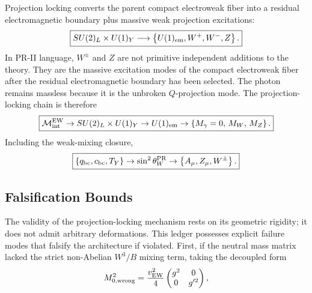 \documentclass[11pt]{article}
\begin{document}
Projection locking converts the parent compact electroweak fiber into a residual electromagnetic boundary plus massive weak projection excitations:
\begin{equation}
\boxed{
SU(2)_L\times U(1)_Y
\longrightarrow
\left\{
U(1)_{\rm em},
W^+,
W^-,
Z
\right\}.
}
\end{equation}
In PR-II language, \(W^\pm\) and \(Z\) are not primitive independent additions to the theory.  They are the massive excitation modes of the compact electroweak fiber after the residual electromagnetic boundary has been selected. The photon remains massless because it is the unbroken \(Q\)-projection mode. The projection-locking chain is therefore
\begin{equation}
\boxed{
\mathcal M_{\rm int}^{\rm EW}
\rightarrow
SU(2)_L\times U(1)_Y
\rightarrow
U(1)_{\rm em}
\rightarrow
\left\{
M_\gamma=0,\,
M_W,\,
M_Z
\right\}.
}
\end{equation}
Including the weak-mixing closure,
\begin{equation}
\boxed{
\left\{
q_{\rm bc},
c_{\rm bc},
T_Y
\right\}
\rightarrow
\sin^2\theta_W^{\rm PR}
\rightarrow
\left\{
A_\mu,
Z_\mu,
W^\pm
\right\}.
}
\end{equation}

\subsection{Falsification Bounds}
\label{sec:pr2_projection_locking_rigidity}

The validity of the projection-locking mechanism rests on its geometric rigidity; it does not admit arbitrary deformations. This ledger possesses explicit failure modes that falsify the architecture if violated. First, if the neutral mass matrix lacked the strict non-Abelian \(W^3/B\) mixing term, taking the decoupled form
\begin{equation}
M_{0,\rm wrong}^2
=
\frac{v_{\rm EW}^2}{4}
\begin{pmatrix}
g^2 & 0\\
0 & g'^2
\end{pmatrix},
\end{equation}
\end{document}
